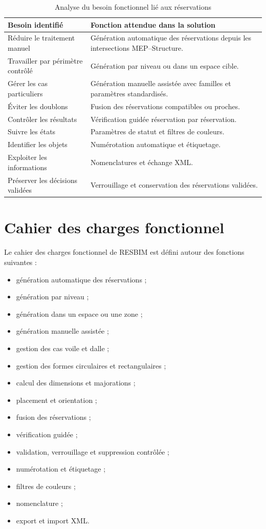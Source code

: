 \documentclass[12pt,a4paper]{report}
\begin{document}
\begin{table}[H]
\centering
\caption{Analyse du besoin fonctionnel lié aux réservations}
\begin{tabularx}{0.95\textwidth}{|L{4.6cm}|Y|}
\hline
\textbf{Besoin identifié} & \textbf{Fonction attendue dans la solution} \\
\hline
Réduire le traitement manuel & Génération automatique des réservations depuis les intersections MEP--Structure. \\
\hline
Travailler par périmètre contrôlé & Génération par niveau ou dans un espace cible. \\
\hline
Gérer les cas particuliers & Génération manuelle assistée avec familles et paramètres standardisés. \\
\hline
Éviter les doublons & Fusion des réservations compatibles ou proches. \\
\hline
Contrôler les résultats & Vérification guidée réservation par réservation. \\
\hline
Suivre les états & Paramètres de statut et filtres de couleurs. \\
\hline
Identifier les objets & Numérotation automatique et étiquetage. \\
\hline
Exploiter les informations & Nomenclatures et échange XML. \\
\hline
Préserver les décisions validées & Verrouillage et conservation des réservations validées. \\
\hline
\end{tabularx}
\end{table}

\section{Cahier des charges fonctionnel}
Le cahier des charges fonctionnel de RESBIM est défini autour des fonctions suivantes :
\begin{itemize}[leftmargin=1.2cm]
    \item génération automatique des réservations ;
    \item génération par niveau ;
    \item génération dans un espace ou une zone ;
    \item génération manuelle assistée ;
    \item gestion des cas voile et dalle ;
    \item gestion des formes circulaires et rectangulaires ;
    \item calcul des dimensions et majorations ;
    \item placement et orientation ;
    \item fusion des réservations ;
    \item vérification guidée ;
    \item validation, verrouillage et suppression contrôlée ;
    \item numérotation et étiquetage ;
    \item filtres de couleurs ;
    \item nomenclature ;
    \item export et import XML.
\end{itemize}
\end{document}
